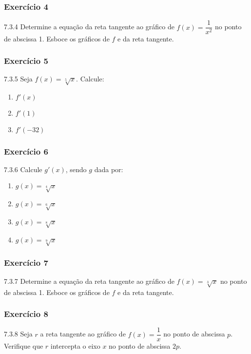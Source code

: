 \subsubsection*{Exercício 4}
\begin{exercicio}[4]{7.3.4}
Determine a equação da reta tangente ao gráfico de $f(x) = \dfrac{1}{x^2}$ no ponto de abscissa 1. Esboce os gráficos de $f$ e da reta tangente.
\end{exercicio}

\subsubsection*{Exercício 5}
\begin{exercicio}[5]{7.3.5}
Seja $f(x) = \sqrt[5]{x}$. Calcule:
\begin{enumerate}[label=\alph*)]
    \item $f'(x)$
    \item $f'(1)$
    \item $f'(-32)$
\end{enumerate}
\end{exercicio}

\subsubsection*{Exercício 6}
\begin{exercicio}[6]{7.3.6}
Calcule $g'(x)$, sendo $g$ dada por:
\begin{enumerate}[label=\alph*)]
    \item $g(x) = \sqrt[4]{x}$
    \item $g(x) = \sqrt[6]{x}$
    \item $g(x) = \sqrt[8]{x}$
    \item $g(x) = \sqrt[9]{x}$
\end{enumerate}
\end{exercicio}

\subsubsection*{Exercício 7}
\begin{exercicio}[7]{7.3.7}
Determine a equação da reta tangente ao gráfico de $f(x) = \sqrt[3]{x}$ no ponto de abscissa 1. Esboce os gráficos de $f$ e da reta tangente.
\end{exercicio}

\subsubsection*{Exercício 8}
\begin{exercicio}[8]{7.3.8}
Seja $r$ a reta tangente ao gráfico de $f(x) = \dfrac{1}{x}$ no ponto de abscissa $p$. Verifique que $r$ intercepta o eixo $x$ no ponto de abscissa $2p$.
\end{exercicio}

